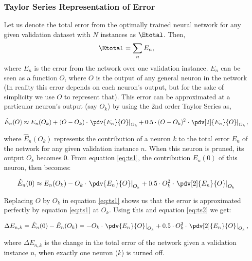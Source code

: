 \subsubsection{Taylor Series Representation of Error}
Let us denote the total error from the optimally trained neural network for any given validation dataset with $N$ instances as $\Etotal$. Then,
\begin{align}
\Etotal = \sum_n E_n,
\end{align}
where $E_n$ is the error from the network over one validation instance. $E_n$ can be seen as a function $O$, where $O$ is the output of any general neuron in the network (In reality this error depends on each neuron's output, but for the sake of simplicity we use $O$ to represent that). This error can be approximated at a particular neuron's output (say $O_k$) by using the 2nd order Taylor Series as,

\begin{align}
\hat E_n(O) \approx E_n(O_k) + (O-O_k)\cdot \left.\pdv{E_n}{O}\right|_{O_k} +  0.5\cdot (O-O_k)^2\cdot \left.\pdv[2]{E_n}{O}\right|_{O_k}\label{eq:ts1},
\end{align}

where $\hat E_n(O_k)$ represents the contribution of a neuron $k$ to the total error $E_n$ of the network for any given validation instance $n$. When this neuron is pruned, its output $O_k$ becomes 0. From equation \ref{eq:ts1}, the contribution $E_n(0)$ of this neuron, then becomes:

\begin{align}
\hat E_n(0) \approx E_n(O_k) - O_k\cdot \left.\pdv{E_n}{O}\right|_{O_k} +  0.5\cdot O_k^2\cdot \left.\pdv[2]{E_n}{O}\right|_{O_k}\label{eq:ts2}
\end{align}

Replacing $O$ by $O_k$ in equation \ref{eq:ts1} shows us that the error is approximated perfectly by equation \ref{eq:ts1} at $O_k$. Using this and equation \ref{eq:ts2} we get:

\begin{align}
\Delta E_{n,k} = \hat E_n(0) - \hat E_n(O_k)= - O_k\cdot \left.\pdv{E_n}{O}\right|_{O_k} + 0.5\cdot O_k^2\cdot \left.\pdv[2]{E_n}{O}\right|_{O_k}\label{eq:ts3},
\end{align}

where $\Delta E_{n,k}$ is the change in the total error of the network given a validation instance $n$, when exactly one neuron ($k$) is turned off.


